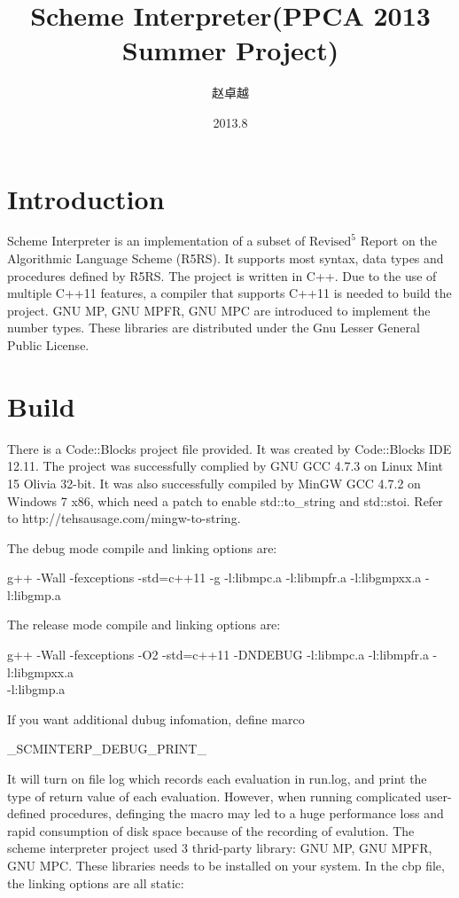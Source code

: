 \documentclass{article}
\title{Scheme Interpreter(PPCA 2013 Summer Project)}
\author{赵卓越}
\date{2013.8}
\begin{document}
\maketitle

\tableofcontents

\newpage

\section{Introduction}
Scheme Interpreter is an implementation of a subset of $\textrm{Revised}^5$ Report on the Algorithmic Language Scheme (R5RS). It supports most syntax, data types and procedures defined by R5RS. The project is written in C++. Due to the use of multiple C++11 features, a compiler that supports C++11 is needed to build the project. GNU MP, GNU MPFR, GNU MPC are introduced to implement the number types. These libraries are distributed under the Gnu Lesser General Public License.

\section{Build}
There is a Code::Blocks project file provided. It was created by Code::Blocks IDE 12.11.
The project was successfully complied by GNU GCC 4.7.3 on Linux Mint 15 Olivia 32-bit. It was also successfully compiled by MinGW GCC 4.7.2 on Windows 7 x86, which need a patch to enable std::to\_string and std::stoi. Refer to http://tehsausage.com/mingw-to-string.

\noindent
The debug mode compile and linking options are:
	
	g++ -Wall -fexceptions -std=c++11 -g  -l:libmpc.a -l:libmpfr.a -l:libgmpxx.a -l:libgmp.a

\noindent
The release mode compile and linking options are:
		
	g++ -Wall -fexceptions -O2 -std=c++11 -DNDEBUG  -l:libmpc.a -l:libmpfr.a -l:libgmpxx.a \\ \quad -l:libgmp.a

\noindent
If you want additional dubug infomation, define marco

	\_SCMINTERP\_DEBUG\_PRINT\_

It will turn on file log which records each evaluation in run.log, and
print the type of return value of each evaluation. However, when running complicated
user-defined procedures, definging the macro may led to a huge performance loss and
rapid consumption of disk space because of the recording of evalution.
The scheme interpreter project used 3 thrid-party library: GNU MP, GNU MPFR, GNU MPC.
These libraries needs to be installed on your system. In the cbp file, the linking
options are all static:
\end{document}
